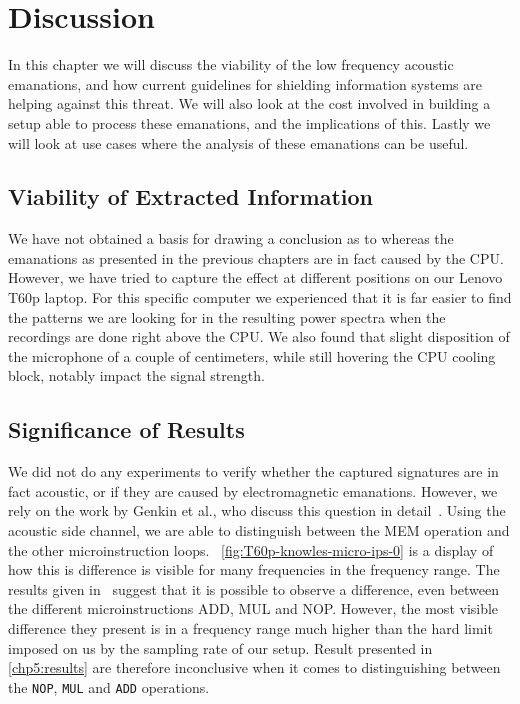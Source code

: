 \chapter{Discussion}\label{chp6:discussion}

In this chapter we will discuss the viability of the low frequency acoustic emanations, and how current guidelines for shielding information systems are helping against this threat.
We will also look at the cost involved in building a setup able to process these emanations, and the implications of this.
Lastly we will look at use cases where the analysis of these emanations can be useful.

\section{Viability of Extracted Information}
We have not obtained a basis for drawing a conclusion as to whereas the emanations as presented in the previous chapters are in fact caused by the \gls{CPU}.
However, we have tried to capture the effect at different positions on our Lenovo T60p laptop. 
For this specific computer we experienced that it is far easier to find the patterns we are looking for in the resulting power spectra when the recordings are done right above the \gls{CPU}.
We also found that slight disposition of the microphone of a couple of centimeters, while still hovering the \gls{CPU} cooling block, notably impact the signal strength.


\section{Significance of Results}

We did not do any experiments to verify whether the captured signatures are in fact acoustic, or if they are caused by electromagnetic emanations.
However, we rely on the work by Genkin et al., who discuss this question in detail~\cite[Section 3.3]{DBLP:journals/iacr/GenkinST13}.
Using the acoustic side channel, we are able to distinguish between the MEM operation and the other microinstruction loops.
~\autoref{fig:T60p-knowles-micro-ips-0} is a display of how this is difference is visible for many frequencies in the frequency range.
The results given in~\cite[Fig.~2]{DBLP:conf/crypto/GenkinST14} suggest that it is possible to observe a difference, even between the different microinstructions ADD, MUL and NOP. 
However, the most visible difference they present is in a frequency range much higher than the hard limit imposed on us by the sampling rate of our setup.
Result presented in \autoref{chp5:results} are therefore inconclusive when it comes to distinguishing between the \texttt{NOP}, \texttt{MUL} and \texttt{ADD} operations.


